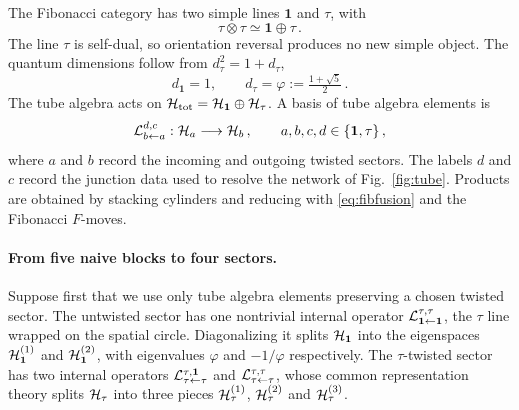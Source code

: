 \documentclass[11pt]{article}
\numberwithin{equation}{section}
\begin{document}
The Fibonacci category has two simple lines $\mathbf 1$ and $\tau$, with
\begin{equation}
  \tau \otimes \tau \simeq \mathbf 1 \oplus \tau \,.
  \label{eq:fibfusion}
\end{equation}
The line $\tau$ is self-dual, so orientation reversal produces no new simple object. The quantum
dimensions follow from $d_\tau^2 = 1 + d_\tau$,
\begin{equation}
  d_{\mathbf 1} = 1, \qquad d_\tau = \varphi := \tfrac{1+\sqrt 5}{2} \,.
  \label{eq:fibdims}
\end{equation}
The tube algebra acts on $\mathcal{H}_{\rm tot} = \mathcal{H}_{\mathbf 1} \oplus \mathcal{H}_\tau$. A basis of tube algebra elements is
\begin{equation}
  \mathcal{L}^{d,c}_{b \leftarrow a} : \mathcal{H}_a \longrightarrow \mathcal{H}_b \,, \qquad a,b,c,d \in \{\mathbf 1,\tau\} \,,
  \label{eq:fibtube}
\end{equation}
where $a$ and $b$ record the incoming and outgoing twisted sectors. The labels $d$ and $c$ record
the junction data used to resolve the network of Fig.~\ref{fig:tube}. Products are obtained by
stacking cylinders and reducing with \eqref{eq:fibfusion} and the Fibonacci $F$-moves.

\paragraph{From five naive blocks to four sectors.}

Suppose first that we use only tube algebra elements preserving a chosen twisted sector. The
untwisted sector has one nontrivial internal operator $\mathcal{L}^{\tau,\tau}_{\mathbf 1 \leftarrow \mathbf 1}$, the $\tau$
line wrapped on the spatial circle. Diagonalizing it splits $\mathcal{H}_{\mathbf 1}$ into the eigenspaces
$\mathcal{H}^{(1)}_{\mathbf 1}$ and $\mathcal{H}^{(2)}_{\mathbf 1}$, with eigenvalues $\varphi$ and $-1/\varphi$ respectively. The
$\tau$-twisted sector has two internal operators $\mathcal{L}^{\tau,\mathbf 1}_{\tau \leftarrow \tau}$ and
$\mathcal{L}^{\tau,\tau}_{\tau \leftarrow \tau}$, whose common representation theory splits $\mathcal{H}_\tau$ into
three pieces $\mathcal{H}^{(1)}_\tau$, $\mathcal{H}^{(2)}_\tau$ and $\mathcal{H}^{(3)}_\tau$.
\end{document}
